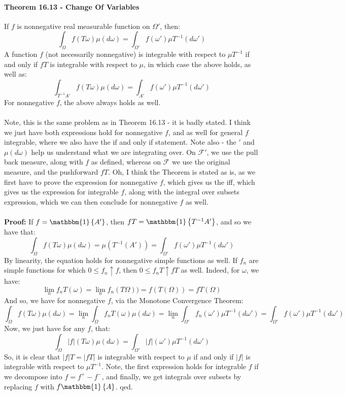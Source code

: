 \documentclass[12pt,a4paper]{article}
\newcommand{\1}[1]{\mathbbm{1}\left\{ #1 \right\}}
\newcommand{\fcal}{\mathcal{F}}
\begin{document}
\paragraph{Theorem 16.13 - Change Of Variables} If $f$ is nonnegative real measurable function on $\Omega'$, then:
$$
	\int_\Omega f(T\omega) \mu(d\omega) = \int_{\Omega'} f(\omega') \mu T^{-1}(d\omega')
$$
A function $f$ (not necessarily nonnegative) is integrable with respect to $\mu T^{-1}$ if and only if $fT$ is integrable with respect to $\mu$, in which case the above holds, as well as:
$$
	\int_{T^{-1}A'} f(T\omega) \mu(d\omega) = \int_{A'} f(\omega') \mu T^{-1}(d\omega')
$$
For nonnegative $f$, the above always holds as well.
\\\\
Note, this is the same problem as in Theorem 16.13 - it is badly stated. I think we just have both expressions hold for nonnegative $f$, and as well for general $f$ integrable, where we also have the if and only if statement. Note also - the $'$ and $\mu(d\omega)$ help us understand what we are integrating over. On $\fcal'$, we use the pull back measure, along with $f$ as defined, whereas on $\fcal$ we use the original measure, and the pushforward $fT$. Oh, I think the Theorem is stated as is, as we first have to prove the expression for nonnegative $f$, which gives us the iff, which gives us the expression for integrable $f$, along with the integral over subsets expression, which we can then conclude for nonnegative $f$ as well.
\\\\
\textbf{Proof:} If $f = \1{A'}$, then $fT = \1{T^{-1}A'}$, and so we have that:
$$
	\int_\Omega f(T\omega) \mu(d\omega) =
	\mu(T^{-1}(A')) =
	\int_{\Omega'} f(\omega') \mu T^{-1}(d\omega')
$$
By linearity, the equation holds for nonnegative simple functions as well. If $f_n$ are simple functions for which $0 \leq f_n \uparrow f$, then $0 \leq f_nT \uparrow fT$ as well. Indeed, for $\omega$, we have:
$$
	\lim_n f_nT(\omega) = \lim_n f_n(T\Omega)) = f(T(\Omega)) = fT(\Omega)
$$
And so, we have for nonnegative $f$, via the Monotone Convergence Theorem:
$$
	\int_\Omega f(T\omega) \mu(d\omega) =
	\lim_n \int_\Omega f_nT(\omega) \mu(d\omega) =
	\lim_n \int_{\Omega'} f_n(\omega') \mu T^{-1}(d\omega') =
	\int_{\Omega'} f(\omega') \mu T^{-1}(d\omega')
$$
Now, we just have for any $f$, that:
$$
	\int_\Omega |f|(T\omega) \mu(d\omega) = \int_{\Omega'} |f|(\omega') \mu T^{-1}(d\omega')
$$
So, it is clear that $|f|T = |fT|$ is integrable with respect to $\mu$ if and only if $|f|$ is integrable with respect to $\mu T^{-1}$. Note, the first expression holds for integrable $f$ if we decompose into $f = f^+ - f^-$, and finally, we get integrals over subsets by replacing $f$ with $f\1{A}$. qed.
\end{document}
